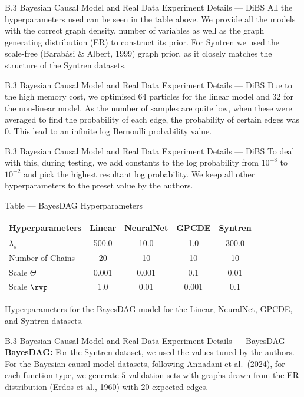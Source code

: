 \documentclass[aspectratio=169,10pt]{beamer}
\begin{document}
\begin{frame}{B.3 Bayesian Causal Model and Real Data Experiment Details --- DiBS}
\small
All the hyperparameters used can be seen in the table above. We provide all the models with the correct graph density, number of variables as well as the graph generating distribution (ER) to construct its prior. For Syntren we used the scale-free (Barab\'asi \& Albert, 1999) graph prior, as it closely matches the structure of the Syntren datasets.
\end{frame}

\begin{frame}{B.3 Bayesian Causal Model and Real Data Experiment Details --- DiBS}
\small
Due to the high memory cost, we optimised $64$ particles for the linear model and $32$ for the non-linear model. As the number of samples are quite low, when these were averaged to find the probability of each edge, the probability of certain edges was $0$. This lead to an infinite log Bernoulli probability value.
\end{frame}

\begin{frame}{B.3 Bayesian Causal Model and Real Data Experiment Details --- DiBS}
To deal with this, during testing, we add constants to the log probability from $10^{-8}$ to $10^{-2}$ and pick the highest resultant log probability. We keep all other hyperparameters to the preset value by the authors.
\end{frame}

\begin{frame}{Table --- BayesDAG Hyperparameters}
\centering
\begin{tabular}{lcccc}
\toprule
\textbf{Hyperparameters} & \textbf{Linear} & \textbf{NeuralNet} & \textbf{GPCDE} & \textbf{Syntren} \\
\midrule
$\lambda_s$  & 500.0 & 10.0 & 1.0 & 300.0 \\
Number of Chains     & 20    & 10   & 10 & 10 \\
Scale $\Theta$    & 0.001 & 0.001 & 0.1  & 0.01\\
Scale $\rvp$ & 1.0   & 0.01  & 0.001 & 0.1 \\
\bottomrule
\end{tabular}

\vspace{0.3cm}
{\footnotesize Hyperparameters for the BayesDAG model for the Linear, NeuralNet, GPCDE, and Syntren datasets.}
\end{frame}

\begin{frame}{B.3 Bayesian Causal Model and Real Data Experiment Details --- BayesDAG}
\small
\textbf{BayesDAG:}\quad
For the Syntren dataset, we used the values tuned by the authors. For the Bayesian causal model datasets, following Annadani et al.\ (2024), for each function type, we generate $5$ validation sets with graphs drawn from the ER distribution (Erdos et al., 1960) with $20$ expected edges.
\end{frame}
\end{document}
